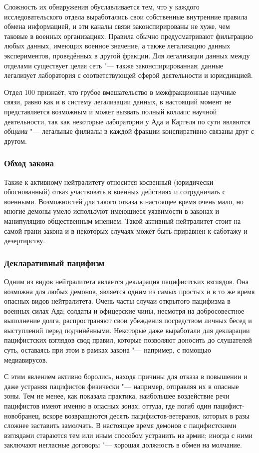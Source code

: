 Сложность их обнаружения обуславливается тем, что у каждого исследовательского отдела выработались свои собственные внутренние правила обмена информацией, и эти каналы связи законспирированы не хуже, чем таковые в военных организациях.
Правила обычно предусматривают фильтрацию любых данных, имеющих военное значение, а также легализацию данных экспериментов, проведённых в другой фракции.
Для легализации данных между отделами существует целая сеть "--- также законспирированная;
данные легализует лаборатория с соответствующей сферой деятельности и юрисдикцией.

Отдел 100 признаёт, что грубое вмешательство в межфракционные научные связи, равно как и в систему легализации данных, в настоящий момент не представляется возможным и может вызвать полный коллапс научной деятельности, так как некоторые лаборатории у Ада и Картеля по сути являются \emph{общими} "--- легальные филиалы в каждой фракции конспиративно связаны друг с другом.

\subsubsection{Обход закона}

Также к активному нейтралитету относится косвенный (юридически обоснованный) отказ участвовать в военных действиях и сотрудничать с военными.
Возможностей для такого отказа в настоящее время очень мало, но многие демоны умело используют имеющиеся уязвимости в законах и манипуляцию общественным мнением.
Такой активный нейтралитет стоит на самой грани закона и в некоторых случаях может быть приравнен к саботажу и дезертирству.

\subsubsection{Декларативный пацифизм}

Одним из видов нейтралитета является декларация пацифистских взглядов.
Она возможна для любых демонов, является одним из самых простых и в то же время опасных видов нейтралитета.
Очень часты случаи открытого пацифизма в военных силах Ада;
солдаты и офицерские чины, несмотря на добросовестное выполнение долга, распространяют свои убеждения посредством личных бесед и выступлений перед подчинёнными.
Некоторые даже выработали для декларации пацифистских взглядов свод правил, которые позволяют доносить до слушателей суть, оставаясь при этом в рамках закона "--- например, с помощью медиавирусов.

С этим явлением активно боролись, находя причины для отказа в повышении и даже устраняя пацифистов физически "--- например, отправляя их в опасные зоны.
Тем не менее, как показала практика, наибольшее воздействие речи пацифистов имеют именно в опасных зонах;
оттуда, где погиб один пацифист-новобранец, вскоре возвращаются десять пацифистов-ветеранов, которых в разы сложнее заставить замолчать.
В настоящее время демонов с пацифистскими взглядами стараются тем или иным способом устранить из армии;
иногда с ними заключают негласные договоры "--- хорошая должность в обмен на молчание.

